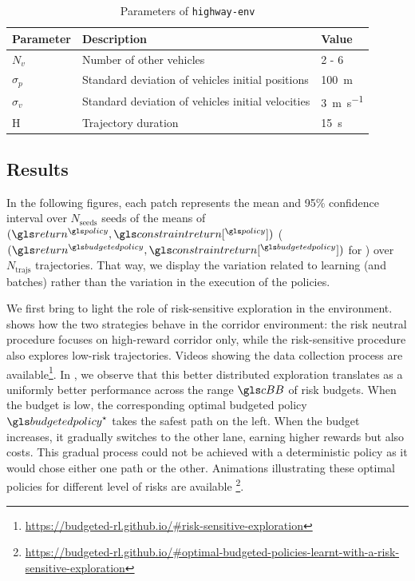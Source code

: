 \begin{table}[ht!]
    \centering
    \begin{tabular}{lll}
        \toprule
        Parameter & Description & Value\tabularnewline
        \midrule
        $N_v$& Number of other vehicles & 2 - 6\tabularnewline
        $\sigma_p$& Standard deviation of vehicles initial positions & \SI{100}{\meter}\tabularnewline
        $\sigma_v$& Standard deviation of vehicles initial velocities & \SI{3}{\meter\per\second}\tabularnewline
        H & Trajectory duration & \SI{15}{\second}\tabularnewline
        \bottomrule
    \end{tabular}

    \caption{Parameters of \texttt{highway-env}}
    \label{tab:param-highway-env}
\end{table}

\subsection{Results}
\label{subsec:results}
In the following figures, each patch represents the mean and 95\% confidence interval over $N_{\text{seeds}}$ seeds of the means of $(\return^{\policy},\constraintreturn[^{\policy}])$ ($(\return^{\budgetedpolicy},\constraintreturn[^{\budgetedpolicy}])$ for \BFTQ) over $N_\text{trajs}$ trajectories. That way, we display the variation related to learning (and batches) rather than the variation in the execution of the policies.

We first bring to light the role of risk-sensitive exploration in the  environment.  shows how the two strategies behave in the corridor environment: the risk neutral procedure focuses on high-reward corridor only, while the risk-sensitive procedure also explores low-risk trajectories. Videos showing the data collection process are available\footnote{\href{https://budgeted-rl.github.io/\#risk-sensitive-exploration}{https://budgeted-rl.github.io/\#risk-sensitive-exploration}}. In , we observe that this better distributed exploration translates as a uniformly better performance across the range $\budgetspace$ of risk budgets. 
When the budget is low, the corresponding optimal budgeted policy $\budgetedpolicy^\star$ takes the safest path on the left. When the budget increases, it gradually switches to the other lane, earning higher rewards but also costs. This gradual process could not be achieved with a deterministic policy as it would chose either one path or the other. Animations illustrating these optimal policies for different level of risks are available \footnote{\href{https://budgeted-rl.github.io/\#optimal-budgeted-policies-learnt-with-a-risk-sensitive-exploration}{https://budgeted-rl.github.io/\#optimal-budgeted-policies-learnt-with-a-risk-sensitive-exploration}}.


